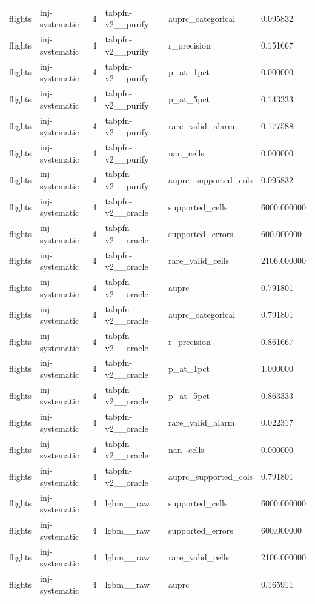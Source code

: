 \begin{tabular}{llllll}
flights & inj-systematic & 4 & tabpfn-v2\_\_purify & auprc\_categorical & 0.095832 \\
flights & inj-systematic & 4 & tabpfn-v2\_\_purify & r\_precision & 0.151667 \\
flights & inj-systematic & 4 & tabpfn-v2\_\_purify & p\_at\_1pct & 0.000000 \\
flights & inj-systematic & 4 & tabpfn-v2\_\_purify & p\_at\_5pct & 0.143333 \\
flights & inj-systematic & 4 & tabpfn-v2\_\_purify & rare\_valid\_alarm & 0.177588 \\
flights & inj-systematic & 4 & tabpfn-v2\_\_purify & nan\_cells & 0.000000 \\
flights & inj-systematic & 4 & tabpfn-v2\_\_purify & auprc\_supported\_cols & 0.095832 \\
flights & inj-systematic & 4 & tabpfn-v2\_\_oracle & supported\_cells & 6000.000000 \\
flights & inj-systematic & 4 & tabpfn-v2\_\_oracle & supported\_errors & 600.000000 \\
flights & inj-systematic & 4 & tabpfn-v2\_\_oracle & rare\_valid\_cells & 2106.000000 \\
flights & inj-systematic & 4 & tabpfn-v2\_\_oracle & auprc & 0.791801 \\
flights & inj-systematic & 4 & tabpfn-v2\_\_oracle & auprc\_categorical & 0.791801 \\
flights & inj-systematic & 4 & tabpfn-v2\_\_oracle & r\_precision & 0.861667 \\
flights & inj-systematic & 4 & tabpfn-v2\_\_oracle & p\_at\_1pct & 1.000000 \\
flights & inj-systematic & 4 & tabpfn-v2\_\_oracle & p\_at\_5pct & 0.863333 \\
flights & inj-systematic & 4 & tabpfn-v2\_\_oracle & rare\_valid\_alarm & 0.022317 \\
flights & inj-systematic & 4 & tabpfn-v2\_\_oracle & nan\_cells & 0.000000 \\
flights & inj-systematic & 4 & tabpfn-v2\_\_oracle & auprc\_supported\_cols & 0.791801 \\
flights & inj-systematic & 4 & lgbm\_\_raw & supported\_cells & 6000.000000 \\
flights & inj-systematic & 4 & lgbm\_\_raw & supported\_errors & 600.000000 \\
flights & inj-systematic & 4 & lgbm\_\_raw & rare\_valid\_cells & 2106.000000 \\
flights & inj-systematic & 4 & lgbm\_\_raw & auprc & 0.165911 \\

\end{tabular}
